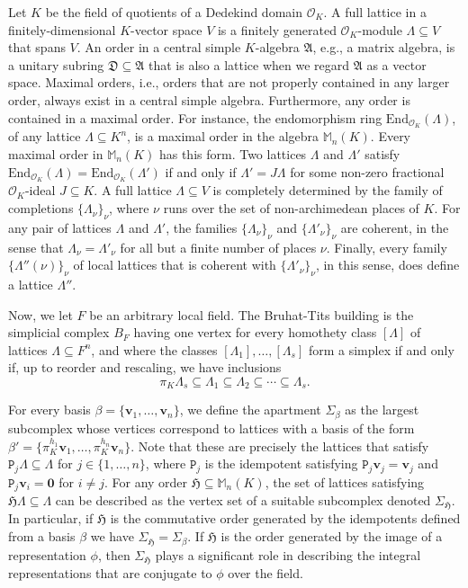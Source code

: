 \documentclass{article}
\theoremstyle{definition}
\begin{document}
Let $K$ be the field of quotients of a Dedekind domain $\mathcal{O}_K$. 
A full lattice in a finitely-dimensional $K$-vector space $V$
is a finitely generated $\mathcal{O}_K$-module 
$\Lambda\subseteq  V$ that spans $V$. 
An order in a central simple $K$-algebra $\mathfrak{A}$, 
e.g., a matrix algebra, is a unitary subring 
$\mathfrak{D}\subseteq\mathfrak{A}$ that
is also a lattice when we regard $\mathfrak{A}$ as
a vector space. Maximal orders, i.e., orders that are not 
properly contained in any larger order, always exist in
a central simple algebra. Furthermore, any order is contained in 
a maximal order. For instance, the endomorphism ring
$\mathrm{End}_{\mathcal{O}_K}(\Lambda)$, of any lattice
$\Lambda\subseteq K^n$, is a maximal order in the algebra
$\mathbb{M}_n(K)$. Every maximal order in $\mathbb{M}_n(K)$
has this form.
Two lattices $\Lambda$ and $\Lambda'$ satisfy
$\mathrm{End}_{\mathcal{O}_K}(\Lambda)=
\mathrm{End}_{\mathcal{O}_K}(\Lambda')$
if and only if $\Lambda'=J\Lambda$ for some non-zero fractional
$\mathcal{O}_K$-ideal $J\subseteq K$. 
A full lattice $\Lambda\subseteq V$ is completely determined
by the family of completions $\{\Lambda_\nu\}_\nu$,
where $\nu$ runs over the set of non-archimedean places of $K$.
For any pair of lattices  $\Lambda$ and $\Lambda'$, the families
$\{\Lambda_\nu\}_\nu$ and $\{\Lambda'_\nu\}_\nu$ are
coherent, in the sense that $\Lambda_\nu=\Lambda'_\nu$
for all but a finite number of places $\nu$. Finally,
every family $\{\Lambda''(\nu)\}_\nu$ of local lattices that
is coherent with $\{\Lambda'_\nu\}_\nu$, in this sense,
does define a lattice $\Lambda''$.

Now, we let $F$ be an arbitrary local field.
The Bruhat-Tits building is the simplicial complex $B_F$ having
one vertex for every homothety class $[\Lambda]$ of lattices 
$\Lambda\subseteq F^n$, and where the classes 
$[\Lambda_1],\dots,[\Lambda_s]$ form a simplex if and only if, 
up to reorder and rescaling, we have inclusions
$$\pi_K\Lambda_s\subseteq\Lambda_1\subseteq\Lambda_2
\subseteq\cdots\subseteq\Lambda_s.$$

For every basis $\beta=\{\mathbf{v}_1,\dots,\mathbf{v}_n\}$,
we define the apartment $\Sigma_\beta$ as the largest subcomplex
whose vertices correspond to lattices with a basis of the form
$\beta'=\{\pi_K^{h_1}\mathbf{v}_1,\dots,\pi_K^{h_n}\mathbf{v}_n\}$.
Note that these are precisely the lattices that satisfy
$\mathtt{P}_j\Lambda\subseteq\Lambda$ for $j\in\{1,\dots,n\}$,
where $\mathtt{P}_j$ is the idempotent satisfying
$\mathtt{P}_j\mathbf{v}_j=\mathbf{v}_j$ and 
$\mathtt{P}_j\mathbf{v}_i=\mathbf{0}$ for $i\neq j$.
For any order $\mathfrak{H}\subseteq\mathbb{M}_n(K)$,
the set of lattices satisfying $\mathfrak{H}\Lambda
\subseteq\Lambda$ can be described as the vertex set of a 
suitable subcomplex denoted $\Sigma_{\mathfrak{H}}$.
In particular, if $\mathfrak{H}$ is the commutative
order generated by the idempotents defined from a basis 
$\beta$ we have $\Sigma_{\mathfrak{H}}=\Sigma_{\beta}$.
If $\mathfrak{H}$ is the order generated by the image of
a representation $\phi$, then $\Sigma_{\mathfrak{H}}$ plays
a significant role in describing the integral 
representations that are conjugate to $\phi$ over the field.
\end{document}
